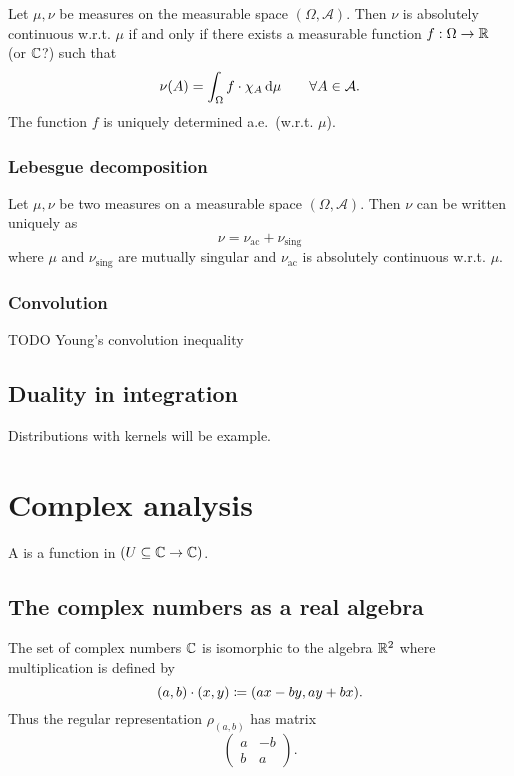\begin{theorem}
Let $\mu,\nu$ be measures on the measurable space $(\Omega,\mathcal{A})$. Then $\nu$ is absolutely continuous w.r.t. $\mu$ \textup{if and only if} there exists a measurable function $f:\Omega\to\mathbb{R}$ (or $\mathbb{C}$?) such that
\[ \nu(A) = \int_\Omega f\cdot \chi_A \operatorname{d \!}{\mu} \qquad \forall A\in\mathcal{A}. \]
The function $f$ is uniquely determined a.e.\ (w.r.t. $\mu$).
\end{theorem}

\subsection{Lebesgue decomposition}
\begin{theorem}
Let $\mu, \nu$ be two measures on a measurable space $(\Omega, \mathcal{A})$. Then $\nu$ can be written uniquely as
\[ \nu = \nu_\text{ac} + \nu_\text{sing} \]
where $\mu$ and $\nu_\text{sing}$ are mutually singular and $\nu_\text{ac}$ is absolutely continuous w.r.t. $\mu$. 

\end{theorem}

\subsection{Convolution}
TODO Young's convolution inequality

\section{Duality in integration}
Distributions with kernels will be example.

\chapter{Complex analysis}
\begin{definition}
A  is a function in $(U\subseteq \mathbb{C} \to \mathbb{C})$.
\end{definition}
\section{The complex numbers as a real algebra}
The set of complex numbers $\mathbb{C}$ is isomorphic to the algebra $\mathbb{R}^2$ where multiplication is defined by
\[ (a, b)\cdot (x, y) \coloneqq (ax-by, ay+bx). \]
Thus the regular representation $\rho_{(a,b)}$ has matrix
\[ \begin{pmatrix}
a & -b \\ b & a
\end{pmatrix}. \]

